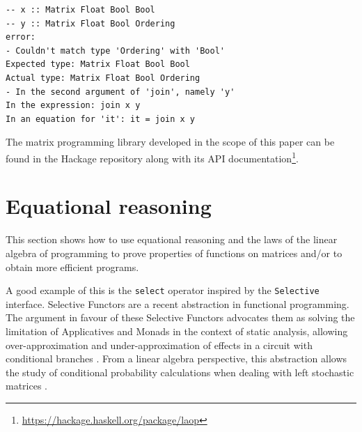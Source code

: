 \documentclass[sigplan,screen]{acmart}\settopmatter{}
\newcommand{\hs}{\texttt}
\def\start{&&}
\def\just#1#2{\\ &#1& \rule{2em}{0pt} \{ \mbox{\rule[-.7em]{0pt}{1.8em} \small #2 \/} \} \nonumber\\ && }
\begin{document}
\begin{verbatim}
-- x :: Matrix Float Bool Bool
-- y :: Matrix Float Bool Ordering
error:
- Couldn't match type 'Ordering' with 'Bool'
Expected type: Matrix Float Bool Bool
Actual type: Matrix Float Bool Ordering
- In the second argument of 'join', namely 'y'
In the expression: join x y
In an equation for 'it': it = join x y
\end{verbatim}

The matrix programming library developed in the scope of this paper can be found in the Hackage repository along with its API documentation\footnote{
\url{https://hackage.haskell.org/package/laop}}.

\section{Equational reasoning}\label{sec-eq-reas}

This section shows how to use equational reasoning and the laws of the linear algebra of programming to prove properties of functions on matrices and/or to obtain more efficient programs.

A good example of this is the \hs{select} operator inspired by the \hs{Selective} interface. Selective Functors are a recent abstraction in functional programming. The argument in favour of these Selective Functors advocates them as solving the limitation of Applicatives and Monads in the context of static analysis, allowing over-approximation and under-approximation of effects in a circuit with conditional branches \cite{andrey2019selective}. From a linear algebra perspective, this abstraction allows the study of conditional probability calculations when dealing with left stochastic matrices \cite{Armando2020}. 
\end{document}

